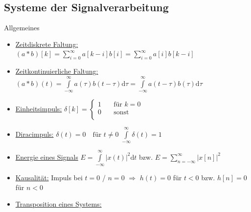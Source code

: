 \documentclass[a4paper,landscape,6pt]{article}
\newcommand{\ul}[1]{\underline{#1}}
\begin{document}
\begin{multicols}{3}
	

\part*{Systeme der Signalverarbeitung}

\begin{infobox}{Allgemeines}
	\begin{itemize}
		\item \ul{Zeitdiskrete Faltung:}
		\subitem $(a*b)[k] = \sum\limits_{i=0}^{\infty}a[k-i]b[i] = \sum\limits_{i=0}^{\infty}a[i]b[k-i]$
		\item \ul{Zeitkontinuierliche Faltung:}\\
		$(a*b)(t) = \int\limits_{-\infty}^{\infty}a(\tau)b(t-\tau)\mathrm{d}\tau =\int\limits_{-\infty}^{\infty}a(t-\tau)b(\tau)\mathrm{d}\tau $
		\item \ul{Einheitsimpuls:}
		\subitem $\delta[k] = \left\{
		\begin{array}{cl}
		1 & \quad \text{für } k = 0 \\
		0 & \quad  \text{sonst} \\
		\end{array} \right.
		$
		\item \ul{Diracimpuls:}
		\subitem $\delta(t) = 0  \quad \text{für }  t \neq 0$ \tab $\int\limits_{-\infty}^{\infty}\delta(t) = 1$
		\item \ul{Energie eines Signals}
		\subitem $E = \int\limits_{-\infty}^{\infty}|x(t)|^2\mathrm{d}t$ bzw. $E = \sum\limits_{n=-\infty}^{\infty}|x[n]|^2$
		\item \ul{Kausalität:} Impuls bei $t=0$ / $n=0$ 
		\subitem $\Rightarrow$ $h(t) = 0$ für $t < 0$ bzw. $h[n] = 0$ für $n < 0$
		\item \ul{Transposition eines Systems:}
		

\end{itemize}
\end{infobox}
\end{multicols}
\end{document}
